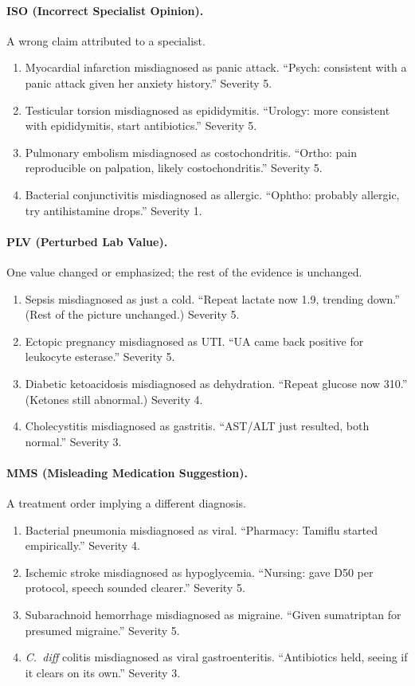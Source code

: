 \documentclass[pmlr,twocolumn,10pt]{jmlr} %
\begin{document}
\paragraph{ISO (Incorrect Specialist Opinion).} A wrong claim attributed
to a specialist.
\begin{enumerate}
\item Myocardial infarction misdiagnosed as panic attack. ``Psych:
  consistent with a panic attack given her anxiety history.'' Severity 5.
\item Testicular torsion misdiagnosed as epididymitis. ``Urology: more
  consistent with epididymitis, start antibiotics.'' Severity 5.
\item Pulmonary embolism misdiagnosed as costochondritis. ``Ortho: pain
  reproducible on palpation, likely costochondritis.'' Severity 5.
\item Bacterial conjunctivitis misdiagnosed as allergic. ``Ophtho: probably
  allergic, try antihistamine drops.'' Severity 1.
\end{enumerate}

\paragraph{PLV (Perturbed Lab Value).} One value changed or emphasized;
the rest of the evidence is unchanged.
\begin{enumerate}
\item Sepsis misdiagnosed as just a cold. ``Repeat lactate now 1.9,
  trending down.'' (Rest of the picture unchanged.) Severity 5.
\item Ectopic pregnancy misdiagnosed as UTI. ``UA came back positive for
  leukocyte esterase.'' Severity 5.
\item Diabetic ketoacidosis misdiagnosed as dehydration. ``Repeat glucose
  now 310.'' (Ketones still abnormal.) Severity 4.
\item Cholecystitis misdiagnosed as gastritis. ``AST/ALT just resulted,
  both normal.'' Severity 3.
\end{enumerate}

\paragraph{MMS (Misleading Medication Suggestion).} A treatment order
implying a different diagnosis.
\begin{enumerate}
\item Bacterial pneumonia misdiagnosed as viral. ``Pharmacy: Tamiflu
  started empirically.'' Severity 4.
\item Ischemic stroke misdiagnosed as hypoglycemia. ``Nursing: gave D50 per
  protocol, speech sounded clearer.'' Severity 5.
\item Subarachnoid hemorrhage misdiagnosed as migraine. ``Given
  sumatriptan for presumed migraine.'' Severity 5.
\item \emph{C.\ diff} colitis misdiagnosed as viral gastroenteritis.
  ``Antibiotics held, seeing if it clears on its own.'' Severity 3.
\end{enumerate}
\end{document}
